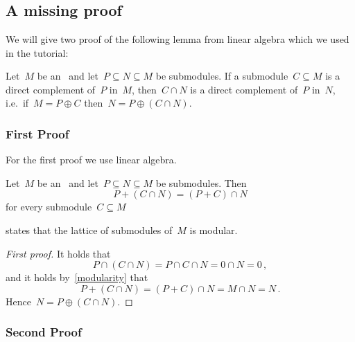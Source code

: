 \section{}





\subsection*{A missing proof}

We will give two proof of the following lemma from linear algebra which we used in the tutorial:

\begin{lemma}
  Let~$M$ be an~{} and let~$P \subseteq N \subseteq M$ be submodules.
  If a submodule~$C \subseteq M$ is a direct complement of~$P$ in~$M$, then~$C \cap N$ is a direct complement of~$P$ in~$N$, i.e.\ if~$M = P \oplus C$ then~$N = P \oplus (C \cap N)$.
\end{lemma}



\subsubsection*{First Proof}

For the first proof we use linear algebra.

\begin{recall}
  \label{modularity}
  Let~$M$ be an~{} and let~$P \subseteq N \subseteq M$ be submodules.
  Then
  \[
      P + (C \cap N)
    = (P + C) \cap N
  \]
  for every submodule~$C \subseteq M$
\end{recall}

\begin{remark}
   states that the lattice of submodules of~$M$ is modular.
\end{remark}

\begin{proof}[First proof]
  It holds that
  \[
      P \cap (C \cap N)
    = P \cap C \cap N
    = 0 \cap N
    = 0 \,,
  \]
  and it holds by~\cref{modularity} that
  \[
      P + (C \cap N)
    = (P + C) \cap N
    = M \cap N
    = N \,.
  \]
  Hence~$N = P \oplus (C \cap N)$.
\end{proof}



\subsubsection*{Second Proof}

